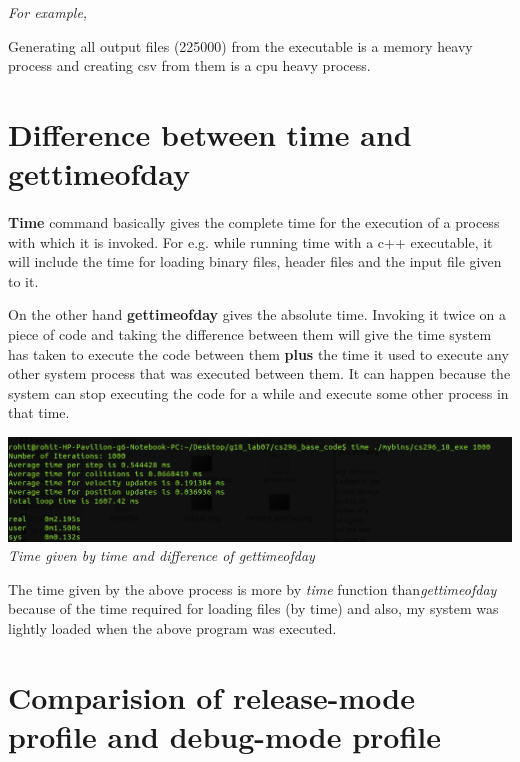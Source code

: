 \documentclass[11pt]{article}
\begin{document}
\textit{For example,}

Generating all output files (225000) from the executable is a memory heavy process and creating csv from them is a 
cpu heavy process.


\section{Difference between time and gettimeofday}
\paragraph{}

\textbf{Time} command basically gives the complete time for the execution of a process with which it is invoked.
For e.g. while running time with a c++ executable, it will include the time for loading binary files, header files
and the input file given to it.

On the other hand \textbf{gettimeofday} gives the absolute time. Invoking it twice on a piece of code and taking 
the difference between them will give the time system has taken to execute the code between them \textbf{plus} the 
time it used to execute any other system process that was executed between them. It can happen because the system
 can stop executing the code for a while and execute some other process in that time.

\begin{center}
 \includegraphics[scale = 0.4]{images/time} \\
  \emph{Time given by time and difference of gettimeofday} \\
\end{center}

The time given by the above process is more by \textit{time} function than\textit{gettimeofday} because
of the time required for loading files (by time) and also, my system was lightly loaded when the above program was executed.


\section{Comparision of release-mode profile and debug-mode profile}
\paragraph{}
\end{document}
